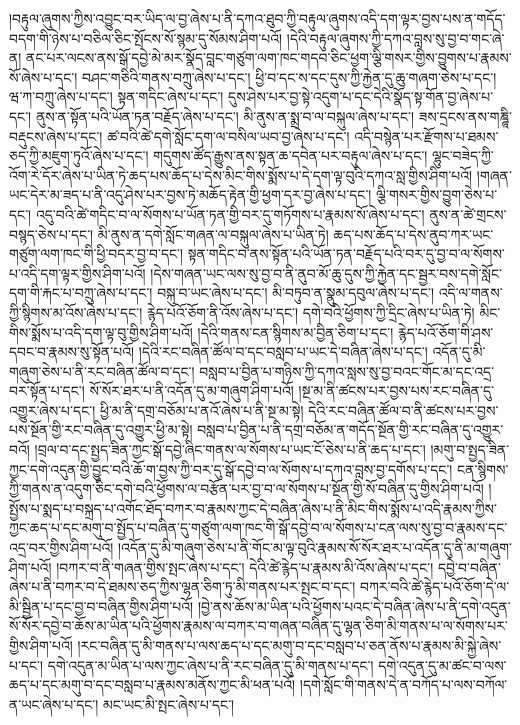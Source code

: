 །བརྟུལ་ཞུགས་ཀྱིས་འབྱུང་བར་ཡིད་ལ་བྱ་ཞེས་པ་ནི་དཀའ་ཐུབ་ཀྱི་བརྟུལ་ཞུགས་འདི་དག་ལྟར་བྱས་པས་ན་གདོད་བདག་གི་ཉེས་པ་བཅིལ་ཅིང་སྤོངས་སོ་སྙམ་དུ་སོམས་ཤིག་པའོ། །དེའི་བརྟུལ་ཞུགས་ཀྱི་དཀའ་བླས་སུ་བྱ་བ་གང་ཞེ་ན། ནང་པར་ལངས་ནས་སྒོ་དབྱེ་མེ་མར་སྣོད་བླང་གཙུག་ལག་ཁང་གདབ་ཅིང་ཕྱག་ལྕི་གསར་གྱིས་བྱུགས་པ་རྣམས་སོ་ཞེས་པ་དང་། བཤང་གཅིའི་གནས་བཀྲུ་ཞེས་པ་དང་། ཕྱི་བ་དང་ས་དང་དུས་ཀྱི་རྐྱེན་དུ་ཆུ་གཞག་ཅེས་པ་དང་། ཝ་ཀ་བཀྲུ་ཞེས་པ་དང་། སྟན་གདིང་ཞེས་པ་དང་། དུས་ཤེས་པར་བྱ་སྟེ་འདུག་པ་དང་དེའི་སྣོད་སྟ་གོན་བྱ་ཞེས་པ་དང་། ནུས་ན་སྟོན་པའི་ཡོན་ཏན་བརྗོད་ཞེས་པ་དང་། མི་ནུས་ན་སྨྲ་བ་ལ་བསྐུལ་ཞེས་པ་དང་། ཟས་དྲངས་ནས་གཎྜཱི་བརྡུངས་ཞེས་པ་དང་། ཚ་བའི་ཚེ་དགེ་སློང་དག་ལ་བསིལ་ཡབ་བྱ་ཞེས་པ་དང་། འདི་བསྙེན་པར་རྫོགས་པ་ཐམས་ཅད་ཀྱི་མཇུག་ཏུའོ་ཞེས་པ་དང་། གདུགས་ཚོད་རྒྱུས་ནས་སྟན་ཆ་དབེན་པར་བརྟུལ་ཞེས་པ་དང་། ལྷུང་བཟེད་ཀྱི་འོག་རེ་དོར་ཞེས་པ་ཡིན་ཏེ་ཆད་པས་ཆོད་པ་དེས་མིང་གིས་སྨོས་པ་དེ་དག་ལྟ་བུའི་དཀའ་སླ་གྱིས་ཤིག་པའོ། །གཞན་ཡང་དེར་མ་ཟད་པ་ནི་འདུ་ཤེས་པར་བྱས་ཏེ་མཆོད་རྟེན་གྱི་ཕྱག་དར་བྱ་ཞེས་པ་དང་། ལྕི་གསར་གྱིས་བྱུག་ཅེས་པ་དང་། འདུ་བའི་ཚེ་གདིང་བ་ལ་སོགས་པ་ཡོན་ཏན་གྱི་བར་དུ་གཏོགས་པ་རྣམས་སོ་ཞེས་པ་དང་། ནུས་ན་ཚེ་གྲངས་བསྙད་ཅེས་པ་དང་། མི་ནུས་ན་དགེ་སློང་གཞན་ལ་བསྐུལ་ཞེས་པ་ཡིན་ཏེ། ཆད་པས་ཆོད་པ་དེས་ནུབ་ཀར་ཡང་གཙུག་ལག་ཁང་གི་ཕྱི་བདར་བྱ་བ་དང་། སྟན་གདིང་བ་ནས་སྟོན་པའི་ཡོན་ཏན་བརྗོད་པའི་བར་དུ་བྱ་བ་ལ་སོགས་པ་འདི་དག་ལྟར་གྱིས་ཤིག་པའོ། །དེས་གཞན་ཡང་ལས་སུ་བྱ་བ་ནི་ནུབ་མོ་ཆུ་དུས་ཀྱི་རྐྱེན་དང་སྦྱར་བས་དགེ་སློང་དག་གི་རྐང་པ་བཀྲུ་ཞེས་པ་དང་། བསྐུ་བ་ཡང་ཞེས་པ་དང་། མི་བཏུབ་ན་སྣུམ་དབུལ་ཞེས་པ་དང་། འདི་ལ་གནས་ཀྱི་སྙིགས་མ་འོས་ཞེས་པ་དང་། རྙེད་པའོ་ཅོག་ནི་འོས་ཞེས་པ་དང་། དགེ་བའི་ཕྱོགས་ཀྱི་དྲིང་ཞེས་པ་ཡིན་ཏེ། མིང་གིས་སྨོས་པ་འདི་དག་ལྟ་བུ་གྱིས་ཤིག་པའོ། །དེའི་གནས་ངན་སྙིགས་མ་བྱིན་ཅིག་པ་དང་། རྙེད་པའོ་ཅོག་གི་ཤས་དབང་བ་རྣམས་སུ་སྟོན་པའོ། །དེའི་རང་བཞིན་ཚོལ་བ་དང་བསླབ་པ་ཡང་དེ་བཞིན་ཞེས་པ་དང་། འདོན་དུ་མི་གཞུག་ཅེས་པ་ནི་རང་བཞིན་ཚོལ་བ་དང་། བསླབ་པ་བྱིན་པ་གཉིས་ཀྱི་དཀའ་སླས་སུ་བྱ་བའང་གོང་མ་དང་འདྲ་བར་སྟོན་པ་དང་། སོ་སོར་ཐར་པ་ནི་འདོན་དུ་མ་གཞུག་ཤིག་པའོ། །སྔ་མ་ནི་ཚངས་པར་བྱས་པས་རང་བཞིན་དུ་འགྱུར་ཞེས་པ་དང་། ཕྱི་མ་ནི་དགྲ་བཅོམ་པ་ནའོ་ཞེས་པ་ནི་སྔ་མ་སྟེ། དེའི་རང་བཞིན་ཚོལ་བ་ནི་ཚངས་པར་བྱས་པས་སྔོན་གྱི་རང་བཞིན་དུ་འགྱུར་ཕྱི་མ་སྟེ། བསླབ་པ་བྱིན་པ་ནི་དགྲ་བཅོམ་ན་གདོད་སྔོན་གྱི་རང་བཞིན་དུ་འགྱུར་བའོ། །བྲལ་བ་དང་སྤྱད་ཟིན་ཀྱང་སྒོ་དབྱེ་ཞིང་གནས་ལ་སོགས་པ་ཡང་ངོ་ཅེས་པ་ནི་ཆད་པ་དང་། །མགུ་བ་སྤྱད་ཟིན་ཀྱང་དགེ་འདུན་གྱི་བྱུང་བའི་ཆོ་ག་བྱས་ཀྱི་བར་དུ་སྒོ་དབྱེ་བ་ལ་སོགས་པ་དཀའ་བླས་བྱ་དགོས་པ་དང་། ངན་སྙིགས་ཀྱི་གནས་ན་འདུག་ཅིང་དགེ་བའི་ཕྱོགས་ལ་བརྩོན་པར་བྱ་བ་ལ་སོགས་པ་སྔོན་གྱི་སོ་བཞིན་དུ་གྱིས་ཤིག་པའོ། །སྤྱོས་པ་སྨད་པ་བསྐྲད་པ་འགོང་ཐོད་བཀར་བ་རྣམས་ཀྱང་དེ་བཞིན་ཞེས་པ་ནི་མིང་གིས་སྨོས་པ་འདི་རྣམས་ཀྱིས་ཀྱང་ཆད་པ་དང་མགུ་བ་སྤྱོད་པ་བཞིན་དུ་གཙུག་ལག་ཁང་གི་སྒོ་དབྱེ་བ་ལ་སོགས་པ་ངན་ལས་སུ་བྱ་བ་རྣམས་དང་འདྲ་བར་གྱིས་ཤིག་པའོ། །འདོན་དུ་མི་གཞུག་ཅེས་པ་ནི་གོང་མ་ལྟ་བུའི་རྣམས་སོ་སོར་ཐར་པ་འདོན་དུ་ནི་མ་གཞུག་ཤིག་པའོ། །བཀར་བ་ནི་གཞན་གྱིས་སྤང་ཞེས་པ་དང་། དེའི་ཚེ་རྙེད་པ་རྣམས་མི་འོས་ཞེས་པ་དང་། དབྱེ་བ་བཞིན་ཞེས་པ་ནི་བཀར་བ་དེ་ཐམས་ཅད་ཀྱིས་ལྷན་ཅིག་ཏུ་མི་གནས་པར་སྤང་བ་དང་། བཀར་བའི་ཚེ་རྙེད་པའོ་ཅོག་དེ་ལ་མི་སྦྱིན་པ་དང་བྱ་བ་བཞིན་གྱིས་ཤིག་པའོ། །བྱེ་ནས་ཆོས་མ་ཡིན་པའི་ཕྱོགས་པའང་དེ་བཞིན་ཞེས་པ་ནི་དགེ་འདུན་སོ་སོར་དབྱེ་བ་ཆོས་མ་ཡིན་པའི་ཕྱོགས་རྣམས་ལ་བཀར་བ་གཞན་བཞིན་དུ་ལྷན་ཅིག་མི་གནས་པ་ལ་སོགས་པར་གྱིས་ཤིག་པའོ། །རང་བཞིན་དུ་མི་གནས་པ་ལས་ཆད་པ་དང་མགུ་བ་དང་བསླབ་པ་ཅན་ནོས་པ་རྣམས་མི་སྐྱེ་ཞེས་པ་དང་། དགེ་འདུན་མ་ཡིན་པ་ལས་ཀྱང་ཞེས་པ་ནི་རང་བཞིན་དུ་མི་གནས་པ་དང་། དགེ་འདུན་དུ་མ་ཚང་བ་ལས་ཆད་པ་དང་མགུ་བ་དང་བསླབ་པ་རྣམས་མནོས་ཀྱང་མི་ཕན་པའོ། །དགེ་སློང་གི་གནས་དེ་ན་བཀོད་པ་ལས་བཀོལ་ན་ཡང་ཞེས་པ་དང་། མང་ཡང་མི་སྤང་ཞེས་པ་དང་། 